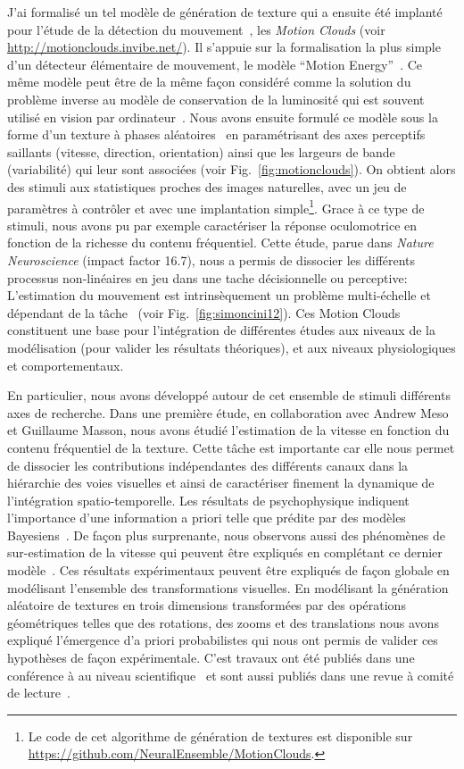 \documentclass[11pt,french,a4paper,oneside]{article}%
\begin{document}
J'ai formalisé un tel modèle de génération de texture qui a ensuite été implanté pour l'étude de la détection du mouvement~\citep{Sanz12}, les \emph{Motion Clouds} (voir \url{http://motionclouds.invibe.net/}). Il s'appuie sur la formalisation la plus simple d'un détecteur élémentaire de mouvement, le modèle ``Motion Energy''~\citep{Adelson85}. Ce même modèle peut être de la même façon considéré comme la solution du problème inverse au modèle de conservation de la luminosité qui est souvent utilisé en vision par ordinateur~\citep{Aubert00}. Nous avons ensuite formulé ce modèle sous la forme d'un texture à phases aléatoires~\citep{Galerne10} en paramétrisant des axes perceptifs saillants (vitesse, direction, orientation) ainsi que les largeurs de bande (variabilité) qui leur sont associées (voir Fig.~\ref{fig:motionclouds}). On obtient alors des stimuli aux statistiques proches des images naturelles, avec un jeu de paramètres à contrôler et avec une implantation simple\footnote{Le code de cet algorithme de génération de textures est disponible sur \url{https://github.com/NeuralEnsemble/MotionClouds}.}. Grace à ce type de stimuli, nous avons pu par exemple caractériser la réponse oculomotrice en fonction de la richesse du contenu fréquentiel. Cette étude, parue dans \emph{Nature Neuroscience} (impact factor 16.7), nous a permis de dissocier les différents processus non-linéaires en jeu dans une tache décisionnelle ou perceptive: L'estimation du mouvement est intrinsèquement un problème multi-échelle et dépendant de la tâche~\citep{Simoncini12} (voir Fig.~\ref{fig:simoncini12}). Ces Motion Clouds constituent une base pour l'intégration de différentes études aux niveaux de la modélisation (pour valider les résultats théoriques), et aux niveaux physiologiques et comportementaux. %

En particulier, nous avons développé autour de cet ensemble de stimuli différents axes de recherche. Dans une première étude, en collaboration avec Andrew Meso et Guillaume Masson, nous avons étudié l'estimation de la vitesse en fonction du contenu fréquentiel de la texture. Cette tâche est importante car elle nous permet de dissocier les contributions indépendantes des différents canaux dans la hiérarchie des voies visuelles et ainsi de caractériser finement la dynamique de l'intégration spatio-temporelle. Les résultats de psychophysique indiquent l'importance d'une information a priori telle que prédite par des modèles Bayesiens~\citep{Stocker06}. De façon plus surprenante, nous observons aussi des phénomènes de sur-estimation de la vitesse qui peuvent être expliqués en complétant ce dernier modèle~\citep{Meso13vss,Meso14vss,Vacher15nips}. Ces résultats expérimentaux peuvent être expliqués de façon globale en modélisant l'ensemble des transformations visuelles.
En modélisant la génération aléatoire de  textures en trois dimensions transformées par des opérations géométriques telles que des rotations, des zooms et des translations nous avons expliqué l'émergence d'a priori probabilistes qui nous ont permis de valider ces hypothèses de façon expérimentale. C'est travaux ont été publiés dans une conférence à au niveau scientifique~\citep{Vacher15nips} et sont aussi publiés dans une revue à comité de lecture~\citep{Vacher16}.
\end{document}
